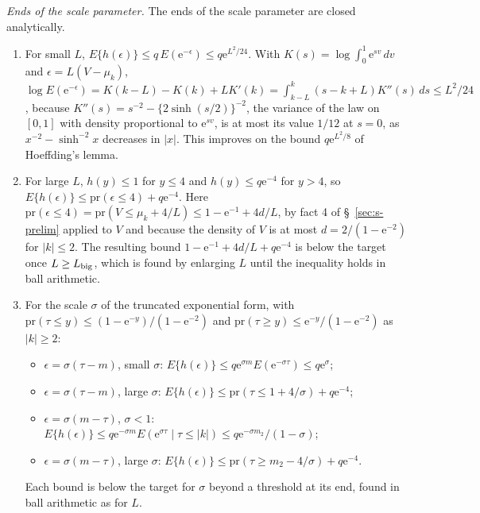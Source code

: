 \documentclass[11pt]{article}
\renewcommand{\_}{\usc\allowbreak}
\newcommand{\pr}{\mathrm{pr}}
\begin{document}
\emph{Ends of the scale parameter.} The ends of the scale parameter are closed analytically.
\begin{enumerate}
\item For small $L$, $E\{h(\epsilon)\} \le q\,E(\mathrm{e}^{-\epsilon}) \le q \mathrm{e}^{L^2/24}$. With $K(s) = \log\int_0^1 \mathrm{e}^{sv}\,dv$ and $\epsilon = L(V - \mu_k)$, $\log E(\mathrm{e}^{-\epsilon}) = K(k - L) - K(k) + LK'(k) = \int_{k-L}^{k} (s - k + L) K''(s)\,ds \le L^2/24$, because $K''(s) = s^{-2} - \{2\sinh(s/2)\}^{-2}$, the variance of the law on $[0, 1]$ with density proportional to $\mathrm{e}^{sv}$, is at most its value $1/12$ at $s = 0$, as $x^{-2} - \sinh^{-2}x$ decreases in $|x|$. This improves on the bound $q \mathrm{e}^{L^2/8}$ of Hoeffding's lemma.
\item For large $L$, $h(y) \le 1$ for $y \le 4$ and $h(y) \le q \mathrm{e}^{-4}$ for $y > 4$, so $E\{h(\epsilon)\} \le \pr(\epsilon \le 4) + q \mathrm{e}^{-4}$. Here $\pr(\epsilon \le 4) = \pr(V \le \mu_k + 4/L) \le 1 - \mathrm{e}^{-1} + 4d/L$, by fact 4 of \S~\ref{sec:s-prelim} applied to $V$ and because the density of $V$ is at most $d = 2/(1 - \mathrm{e}^{-2})$ for $|k| \le 2$. The resulting bound $1 - \mathrm{e}^{-1} + 4d/L + q \mathrm{e}^{-4}$ is below the target once $L \ge L_{\rm big}$, which is found by enlarging $L$ until the inequality holds in ball arithmetic.
\item For the scale $\sigma$ of the truncated exponential form, with $\pr(\tau \le y) \le (1 - \mathrm{e}^{-y})/(1 - \mathrm{e}^{-2})$ and $\pr(\tau \ge y) \le \mathrm{e}^{-y}/(1 - \mathrm{e}^{-2})$ as $|k| \ge 2$:
\begin{itemize}
\item $\epsilon = \sigma(\tau - m)$, small $\sigma$: $E\{h(\epsilon)\} \le q\mathrm{e}^{\sigma m}E(\mathrm{e}^{-\sigma\tau}) \le q\mathrm{e}^{\sigma}$;
\item $\epsilon = \sigma(\tau - m)$, large $\sigma$: $E\{h(\epsilon)\} \le \pr(\tau \le 1 + 4/\sigma) + q\mathrm{e}^{-4}$;
\item $\epsilon = \sigma(m - \tau)$, $\sigma < 1$: $E\{h(\epsilon)\} \le q\mathrm{e}^{-\sigma m}E(\mathrm{e}^{\sigma\tau} \mid \tau \le |k|) \le q\mathrm{e}^{-\sigma m_2}/(1 - \sigma)$;
\item $\epsilon = \sigma(m - \tau)$, large $\sigma$: $E\{h(\epsilon)\} \le \pr(\tau \ge m_2 - 4/\sigma) + q\mathrm{e}^{-4}$.
\end{itemize}
Each bound is below the target for $\sigma$ beyond a threshold at its end, found in ball arithmetic as for $L$.
\end{enumerate}
\end{document}
